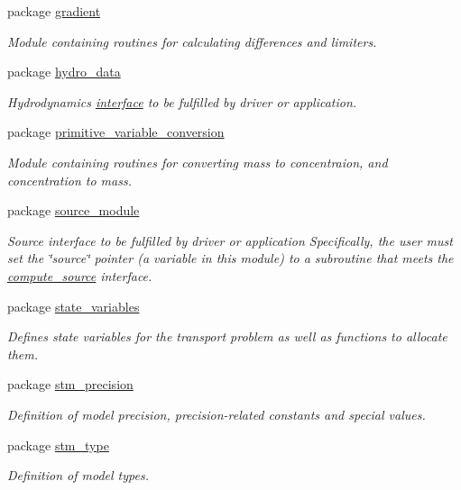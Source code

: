 \begin{CompactItemize}
\item 
package \hyperlink{a00065}{gradient}
\begin{CompactList}\small\item\em Module containing routines for calculating differences and limiters. \item\end{CompactList}

\item 
package \hyperlink{a00067}{hydro\_\-data}
\begin{CompactList}\small\item\em Hydrodynamics \hyperlink{a00004}{interface} to be fulfilled by driver or application. \item\end{CompactList}

\item 
package \hyperlink{a00071}{primitive\_\-variable\_\-conversion}
\begin{CompactList}\small\item\em Module containing routines for converting mass to concentraion, and concentration to mass. \item\end{CompactList}

\item 
package \hyperlink{a00072}{source\_\-module}
\begin{CompactList}\small\item\em Source interface to be fulfilled by driver or application Specifically, the user must set the \char`\"{}source\char`\"{} pointer (a variable in this module) to a subroutine that meets the \hyperlink{a00001}{compute\_\-source} interface. \item\end{CompactList}

\item 
package \hyperlink{a00073}{state\_\-variables}
\begin{CompactList}\small\item\em Defines state variables for the transport problem as well as functions to allocate them. \item\end{CompactList}

\item 
package \hyperlink{a00074}{stm\_\-precision}
\begin{CompactList}\small\item\em Definition of model precision, precision-related constants and special values. \item\end{CompactList}

\item 
package \hyperlink{a00075}{stm\_\-type}
\begin{CompactList}\small\item\em Definition of model types. \item\end{CompactList}

\end{CompactItemize}

